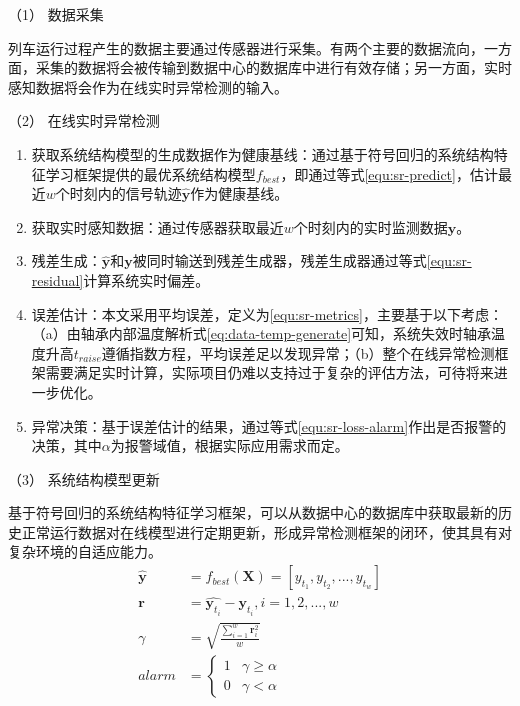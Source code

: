 （1） 数据采集

列车运行过程产生的数据主要通过传感器进行采集。有两个主要的数据流向，一方面，采集的数据将会被传输到数据中心的数据库中进行有效存储；另一方面，实时感知数据将会作为在线实时异常检测的输入。

（2） 在线实时异常检测
\begin{enumerate}[1.]
    \item 获取系统结构模型的生成数据作为健康基线：通过基于符号回归的系统结构特征学习框架提供的最优系统结构模型$f_{best}$，即通过等式\ref{equ:sr-predict}，估计最近$w$个时刻内的信号轨迹$\mathbf{\hat{y}}$作为健康基线。
    \item 获取实时感知数据：通过传感器获取最近$w$个时刻内的实时监测数据$\mathbf{y}$。
    \item 残差生成：$\mathbf{\hat{y}}$和$\mathbf{y}$被同时输送到残差生成器，残差生成器通过等式\ref{equ:sr-residual}计算系统实时偏差。
    \item 误差估计：本文采用平均误差，定义为\ref{equ:sr-metrics}，主要基于以下考虑：（a）由轴承内部温度解析式\ref{eq:data-temp-generate}可知，系统失效时轴承温度升高$t_{raise}$遵循指数方程，平均误差足以发现异常；（b）整个在线异常检测框架需要满足实时计算，实际项目仍难以支持过于复杂的评估方法，可待将来进一步优化。
    \item 异常决策：基于误差估计的结果，通过等式\ref{equ:sr-loss-alarm}作出是否报警的决策，其中$\alpha$为报警域值，根据实际应用需求而定。
\end{enumerate}

（3） 系统结构模型更新

基于符号回归的系统结构特征学习框架，可以从数据中心的数据库中获取最新的历史正常运行数据对在线模型进行定期更新，形成异常检测框架的闭环，使其具有对复杂环境的自适应能力。
\begin{subequations}
\begin{align}
\mathbf{\hat{y}} &= f_{best}(\mathbf{X}) = [y_{t_{1}}, y_{t_{2}}, ..., y_{t_{w}}] \label{equ:sr-predict}\\
\mathbf{r} &= \hat{\mathbf{y}_{t_{i}}} - \mathbf{y}_{t_{i}}, i=1,2,...,w \label{equ:sr-residual} \\
\gamma  &= \sqrt{\frac{\sum_{i=1}^{w} \mathbf{r}_{i}^{2}}{w} } \label{equ:sr-metrics} \\
alarm &= \begin{cases}
 1 &  \gamma \geqslant \alpha   \\ 
 0 &   \gamma  < \alpha
\end{cases} \label{equ:sr-loss-alarm}
\end{align}
\end{subequations}

